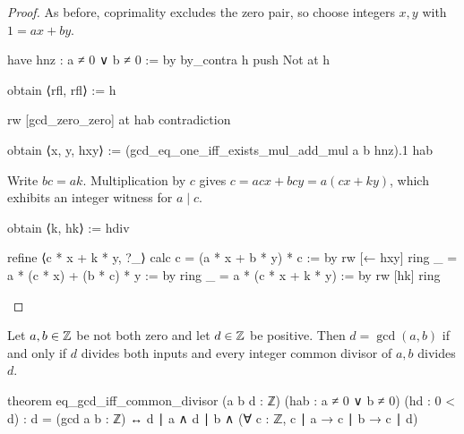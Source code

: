 \begin{proof}
  As before, coprimality excludes the zero pair, so choose integers $x,y$ with $1=ax+by$.

  \begin{lean}
    have hnz : a ≠ 0 ∨ b ≠ 0 := by
      by_contra h
      push Not at h

      obtain ⟨rfl, rfl⟩ := h

      rw [gcd_zero_zero] at hab
      contradiction

    obtain ⟨x, y, hxy⟩ := (gcd_eq_one_iff_exists_mul_add_mul a b hnz).1 hab
  \end{lean}
  Write $bc=ak$.
  Multiplication by $c$ gives $c=acx+bcy=a(cx+ky)$, which exhibits an integer witness for $a\mid
    c$.

  \begin{lean}
    obtain ⟨k, hk⟩ := hdiv

    refine ⟨c * x + k * y, ?_⟩
    calc
      c = (a * x + b * y) * c := by
        rw [← hxy]
        ring
      _ = a * (c * x) + (b * c) * y := by
        ring
      _ = a * (c * x + k * y) := by
        rw [hk]
        ring
  \end{lean}
\end{proof}

\begin{theorem}
  \label{ent:thm:gcd-divisibility-characterization}
  Let $a,b\in\mathbb{Z}$ be not both zero and let $d\in\mathbb{Z}$ be positive.
  Then $d=\gcd(a,b)$ if and only if $d$ divides both inputs and every integer common divisor of
  $a,b$ divides $d$.

  \begin{lean}
    theorem eq_gcd_iff_common_divisor (a b d : ℤ) (hab : a ≠ 0 ∨ b ≠ 0)
        (hd : 0 < d) :
        d = (gcd a b : ℤ) ↔
          d ∣ a ∧ d ∣ b ∧ (∀ c : ℤ, c ∣ a → c ∣ b → c ∣ d)
  \end{lean}
\end{theorem}

